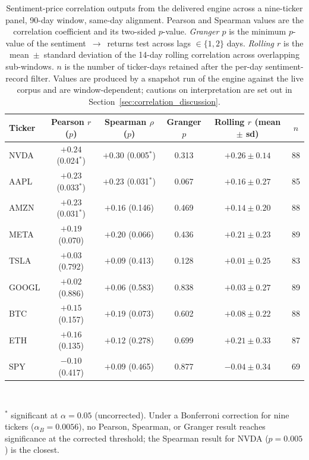 \begin{table}[H]
  \centering
  \small
  \caption{Sentiment-price correlation outputs from the delivered engine across a nine-ticker panel, 90-day window, same-day alignment. Pearson and Spearman values are the correlation coefficient and its two-sided $p$-value. \textit{Granger $p$} is the minimum $p$-value of the sentiment~$\to$~returns test across lags $\in \{1, 2\}$ days. \textit{Rolling $r$} is the mean~$\pm$~standard deviation of the 14-day rolling correlation across overlapping sub-windows. $n$ is the number of ticker-days retained after the per-day sentiment-record filter. Values are produced by a snapshot run of the engine against the live corpus and are window-dependent; cautions on interpretation are set out in Section~\ref{sec:correlation_discussion}.}
  \label{tab:correlation_panel}
  \begin{tabular}{@{}l c c c c c@{}}
    \toprule
    \textbf{Ticker} & \textbf{Pearson $r$ ($p$)} & \textbf{Spearman $\rho$ ($p$)} & \textbf{Granger $p$} & \textbf{Rolling $r$ (mean $\pm$ sd)} & \textbf{$n$} \\
    \midrule
    NVDA    & $+0.24$ (0.024$^{*}$) & $+0.30$ (0.005$^{*}$) & 0.313 & $+0.26 \pm 0.14$ & 88 \\
    AAPL    & $+0.23$ (0.033$^{*}$) & $+0.23$ (0.031$^{*}$) & 0.067 & $+0.16 \pm 0.27$ & 85 \\
    AMZN    & $+0.23$ (0.031$^{*}$) & $+0.16$ (0.146)       & 0.469 & $+0.14 \pm 0.20$ & 88 \\
    META    & $+0.19$ (0.070)       & $+0.20$ (0.066)       & 0.436 & $+0.21 \pm 0.23$ & 89 \\
    TSLA    & $+0.03$ (0.792)       & $+0.09$ (0.413)       & 0.128 & $+0.01 \pm 0.25$ & 83 \\
    GOOGL   & $+0.02$ (0.886)       & $+0.06$ (0.583)       & 0.838 & $+0.03 \pm 0.27$ & 89 \\
    BTC     & $+0.15$ (0.157)       & $+0.19$ (0.073)       & 0.602 & $+0.08 \pm 0.22$ & 88 \\
    ETH     & $+0.16$ (0.135)       & $+0.12$ (0.278)       & 0.699 & $+0.21 \pm 0.33$ & 87 \\
    SPY     & $-0.10$ (0.417)       & $+0.09$ (0.465)       & 0.877 & $-0.04 \pm 0.34$ & 69 \\
    \bottomrule
  \end{tabular} \\[4pt]
  \raggedright \footnotesize $^{*}$ significant at $\alpha = 0.05$ (uncorrected). Under a Bonferroni correction for nine tickers ($\alpha_B = 0.0056$), no Pearson, Spearman, or Granger result reaches significance at the corrected threshold; the Spearman result for NVDA ($p = 0.005$) is the closest.
\end{table}

